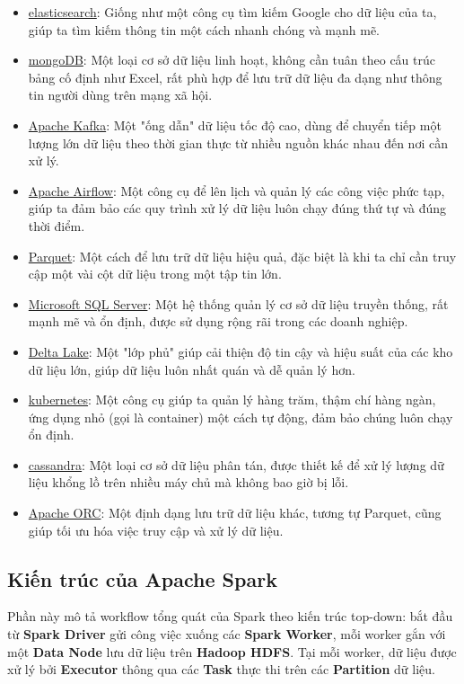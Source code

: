 \documentclass[11pt]{article}
\begin{document}
\begin{itemize}
\item \href{https://www.elastic.co/}{elasticsearch}: Giống như một công cụ tìm kiếm Google cho dữ liệu của ta, giúp ta tìm kiếm thông tin một cách nhanh chóng và mạnh mẽ.
\item \href{https://www.mongodb.com/}{mongoDB}: Một loại cơ sở dữ liệu linh hoạt, không cần tuân theo cấu trúc bảng cố định như Excel, rất phù hợp để lưu trữ dữ liệu đa dạng như thông tin người dùng trên mạng xã hội.
\item \href{https://kafka.apache.org/}{Apache Kafka}: Một "ống dẫn" dữ liệu tốc độ cao, dùng để chuyển tiếp một lượng lớn dữ liệu theo thời gian thực từ nhiều nguồn khác nhau đến nơi cần xử lý.
\item \href{https://airflow.apache.org/}{Apache Airflow}: Một công cụ để lên lịch và quản lý các công việc phức tạp, giúp ta đảm bảo các quy trình xử lý dữ liệu luôn chạy đúng thứ tự và đúng thời điểm.
\item \href{https://parquet.apache.org/}{Parquet}: Một cách để lưu trữ dữ liệu hiệu quả, đặc biệt là khi ta chỉ cần truy cập một vài cột dữ liệu trong một tập tin lớn.
\item \href{https://www.microsoft.com/en-us/sql-server}{Microsoft SQL Server}: Một hệ thống quản lý cơ sở dữ liệu truyền thống, rất mạnh mẽ và ổn định, được sử dụng rộng rãi trong các doanh nghiệp.
\item \href{https://delta.io/}{Delta Lake}: Một "lớp phủ" giúp cải thiện độ tin cậy và hiệu suất của các kho dữ liệu lớn, giúp dữ liệu luôn nhất quán và dễ quản lý hơn.
\item \href{https://kubernetes.io/}{kubernetes}: Một công cụ giúp ta quản lý hàng trăm, thậm chí hàng ngàn, ứng dụng nhỏ (gọi là container) một cách tự động, đảm bảo chúng luôn chạy ổn định.
\item \href{http://cassandra.apache.org/}{cassandra}: Một loại cơ sở dữ liệu phân tán, được thiết kế để xử lý lượng dữ liệu khổng lồ trên nhiều máy chủ mà không bao giờ bị lỗi.
\item \href{https://orc.apache.org/}{Apache ORC}: Một định dạng lưu trữ dữ liệu khác, tương tự Parquet, cũng giúp tối ưu hóa việc truy cập và xử lý dữ liệu.
\end{itemize}


\subsection{Kiến trúc của Apache Spark}
Phần này mô tả workflow tổng quát của Spark theo kiến trúc top-down: bắt đầu từ \textbf{Spark Driver} gửi công việc xuống các \textbf{Spark Worker}, mỗi worker gắn với một \textbf{Data Node} lưu dữ liệu trên \textbf{Hadoop HDFS}. Tại mỗi worker, dữ liệu được xử lý bởi \textbf{Executor} thông qua các \textbf{Task} thực thi trên các \textbf{Partition} dữ liệu.
\end{document}
